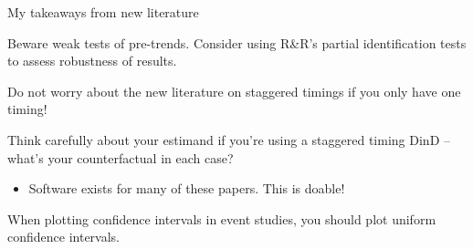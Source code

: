 \documentclass[notes,11pt, aspectratio=169]{beamer}
\newenvironment{wideitemize}{\itemize\addtolength{\itemsep}{10pt}}{\enditemize}
\begin{document}
\begin{frame}{My takeaways from new literature}
  \begin{wideitemize}
  \item Beware weak tests of pre-trends. Consider using R\&R's
    partial identification tests to assess robustness of results. 
  \item Do not worry about the new literature on staggered timings if you only have one timing!
  \item Think carefully about your estimand if you're using a staggered timing DinD -- what's your counterfactual in each case?
    \begin{itemize}
    \item Software exists for many of these papers. This is doable!
    \end{itemize}
  \item When plotting confidence intervals in event studies, you should plot uniform confidence intervals.
  \end{wideitemize}
\end{frame}
\end{document}
